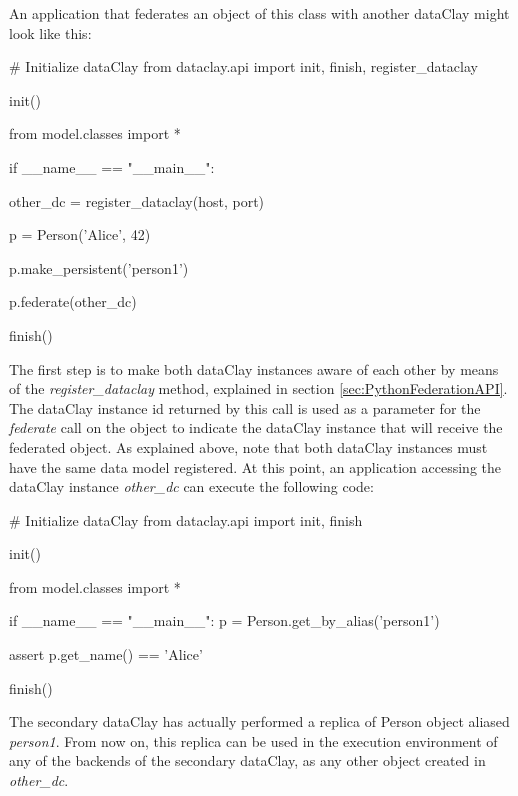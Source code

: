 An application that federates an object of this class with another dataClay might look like this:

\begin{tBox}
\begin{python}
# Initialize dataClay
from dataclay.api import init, finish, register_dataclay

init()

from model.classes import *

if __name__ == "__main__":
   
    other_dc = register_dataclay(host, port)
    
    p = Person('Alice', 42)

    p.make_persistent('person1')

    p.federate(other_dc)
    
    finish()
\end{python}
\end{tBox}

The first step is to make both dataClay instances aware of each other by means of the \textit{register\_dataclay} method, explained in section \ref{sec:PythonFederationAPI}. The dataClay instance id returned by this call is used as a parameter for the \textit{federate} call on the object to indicate the dataClay instance that will receive the federated object. As explained above, note that both dataClay instances must have the same data model registered. 
At this point, an application accessing the dataClay instance \textit{other\_dc} can execute the following code:

\begin{tBox}
\begin{python}
# Initialize dataClay
from dataclay.api import init, finish

init()

from model.classes import *

if __name__ == "__main__":
    p = Person.get_by_alias('person1')
    
    assert p.get\_name() == 'Alice'
    
    finish()
\end{python}
\end{tBox}

The secondary dataClay has actually performed a replica of Person object aliased \textit{person1}. From now on, this 
replica can be used in the execution environment of any of the backends of the secondary dataClay, as any other object created in \textit{other\_dc}.

